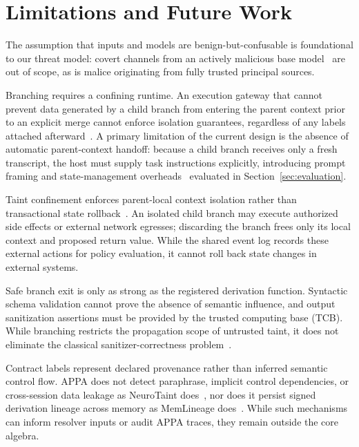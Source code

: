 \section{Limitations and Future Work}\label{sec:limitations}

The assumption that inputs and models are benign-but-confusable is foundational to our threat model: covert channels from an actively malicious base model~\cite{hubinger2024sleeper} are out of scope, as is malice originating from fully trusted principal sources.

Branching requires a confining runtime. An execution gateway that cannot prevent data generated by a child branch from entering the parent context prior to an explicit merge cannot enforce isolation guarantees, regardless of any labels attached afterward~\cite{lampson1973note}. A primary limitation of the current design is the absence of automatic parent-context handoff: because a child branch receives only a fresh transcript, the host must supply task instructions explicitly, introducing prompt framing and state-management overheads~\cite{wu2023autogen} evaluated in Section~\ref{sec:evaluation}.

Taint confinement enforces parent-local context isolation rather than transactional state rollback~\cite{wangAgentTracesTrust2026}. An isolated child branch may execute authorized side effects or external network egresses; discarding the branch frees only its local context and proposed return value. While the shared event log records these external actions for policy evaluation, it cannot roll back state changes in external systems.

Safe branch exit is only as strong as the registered derivation function. Syntactic schema validation cannot prove the absence of semantic influence, and output sanitization assertions must be provided by the trusted computing base (TCB). While branching restricts the propagation scope of untrusted taint, it does not eliminate the classical sanitizer-correctness problem~\cite{schwartz2010all}.

Contract labels represent declared provenance rather than inferred semantic control flow. APPA does not detect paraphrase, implicit control dependencies, or cross-session data leakage as NeuroTaint does~\cite{caiGhostAgentRedefining2026}, nor does it persist signed derivation lineage across memory as MemLineage does~\cite{ouyangMemLineageLineageGuidedEnforcement2026}. While such mechanisms can inform resolver inputs or audit APPA traces, they remain outside the core algebra.

